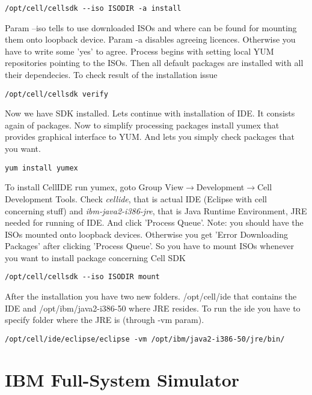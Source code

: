 \begin{verbatim}
/opt/cell/cellsdk --iso ISODIR -a install
\end{verbatim}

Param --iso tells to use downloaded ISOs and where can be found for mounting them onto loopback device. Param -a disables agreeing licences. Otherwise you have to write some 'yes' to agree. Process begins with setting local YUM repositories pointing to the ISOs. Then all default packages are installed with all their dependecies. To check result of the installation issue

\begin{verbatim}
/opt/cell/cellsdk verify
\end{verbatim}

Now we have SDK installed. Lets continue with installation of IDE. It consists again of packages. Now to simplify processing packages install yumex that provides graphical interface to YUM. And lets you simply check packages that you want.

\begin{verbatim}
yum install yumex
\end{verbatim}

To install CellIDE run yumex, goto Group View$\rightarrow$Development$\rightarrow$Cell Development Tools. Check \textit{cellide}, that is actual IDE (Eclipse with cell concerning stuff) and \textit{ibm-java2-i386-jre}, that is Java Runtime Environment, JRE needed for running of IDE. And click 'Process Queue'. Note: you should have the ISOs mounted onto loopback devices. Otherwise you get 'Error Downloading Packages' after clicking 'Process Queue'. So you have to mount ISOs whenever you want to install package concerning Cell SDK

\begin{verbatim}
/opt/cell/cellsdk --iso ISODIR mount
\end{verbatim}

After the installation you have two new folders. /opt/cell/ide that contains the IDE and /opt/ibm/java2-i386-50 where JRE resides. To run the ide you have to specify folder where the JRE is (through -vm param).

\begin{verbatim}
/opt/cell/ide/eclipse/eclipse -vm /opt/ibm/java2-i386-50/jre/bin/
\end{verbatim}

\section{IBM Full-System Simulator}

